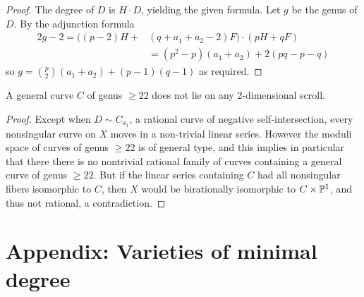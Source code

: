 \begin{proof} The degree of $D$ is $H\cdot D$, yielding the given formula. Let $g$ be the genus of $D$. 
By the adjunction formula
\begin{align*}
2g-2 =  \bigl((p-2)H+&(q+a_{1}+a_{2}-2)F\bigr)\cdot (pH+qF)\\ 
 &= (p^{2}-p)(a_{1}+a_{2})+2(pq-p-q)
\end{align*}
so $g = {p\choose 2}(a_{1}+a_{2}) + (p-1)(q-1)$ as required.
\end{proof}

\begin{fact}
A general curve $C$ of  genus $\geq 22$ does not lie on any 2-dimensional scroll.
\end{fact}
\begin{proof}
Except when $D\sim C_{a_{1}}$, a rational curve of negative self-intersection, every nonsingular curve on $X$ moves in a non-trivial linear series. However the moduli space of curves of genus $\geq 22$ is of general type, and this implies in particular that there there is no nontrivial rational family of curves containing a general curve of 
genus $\geq 22$. But if the linear series containing $C$ had all nonsingular fibers isomorphic to $C$, then
$X$ would be birationally isomorphic to $C\times \PP^{1}$, and thus not rational, a contradiction.
\end{proof}



\section{Appendix: Varieties of minimal degree}




%

